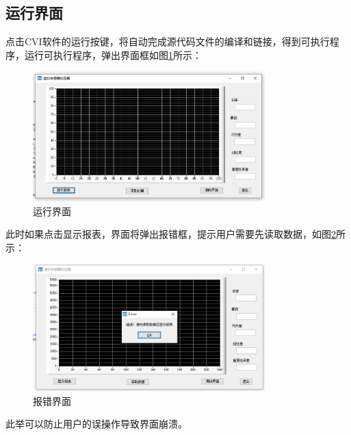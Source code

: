 \documentclass[a4paper,12pt,twoside]{article}%
\begin{document}
\subsection{运行界面}
点击CVI软件的运行按键，将自动完成源代码文件的编译和链接，得到可执行程序，运行可执行程序，弹出界面框如图\ref{fig:run}所示：
\begin{figure}[H]
  \centering
  \includegraphics[width=0.8\textwidth]{运行界面.png}
  \caption{运行界面}
  \label{fig:run}
\end{figure}
此时如果点击显示报表，界面将弹出报错框，提示用户需要先读取数据，如图\ref{fig:err}所示：
\begin{figure}[H]
  \centering
  \includegraphics[width=0.8\textwidth]{报错界面.png}
  \caption{报错界面}
  \label{fig:err}
\end{figure}
此举可以防止用户的误操作导致界面崩溃。
\end{document}
